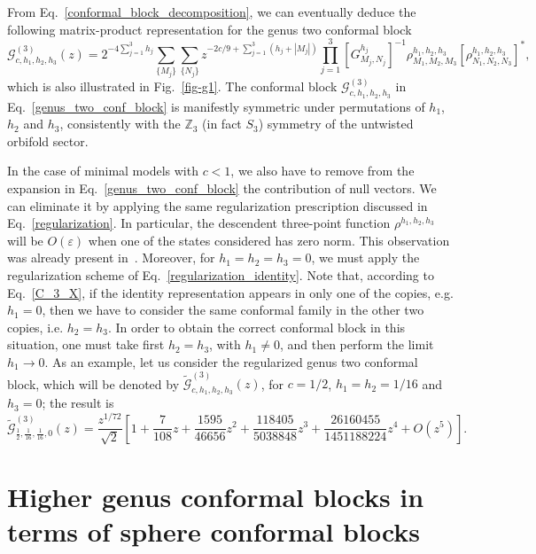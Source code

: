 \documentclass[a4paper,11pt]{article}
\begin{document}
From Eq.~\eqref{conformal_block_decomposition}, we can eventually deduce the following matrix-product representation
for the genus two conformal block \cite{Collier}
\begin{equation}\label{genus_two_conf_block}
 \mathcal{G}_{c, h_1, h_2, h_3}^{(3)}(z)=
 2^{-4\sum\limits_{j=1}^3h_j}
 \sum_{\{M_j\}}\sum_{\{N_j\}}
 z^{-2c/9+\sum\limits_{j=1}^3(h_j+|M_j|)}
 \prod_{j=1}^3 [G_{M_j,N_j}^{h_j}]^{-1}
 \rho^{h_1,h_2,h_3}_{M_1,M_2,M_3}[\rho_{N_1,N_2,N_3}^{h_1,h_2,h_3}]^*,
\end{equation}
which is also illustrated in Fig.~\ref{fig-g1}.
The conformal block $\mathcal{G}_{c, h_1, h_2, h_3}^{(3)}$ in Eq.~\eqref{genus_two_conf_block} is
manifestly symmetric under permutations of $h_1$, $h_2$ and $h_3$, consistently with the $\mathbb Z_3$ (in fact $S_3$) symmetry of the untwisted orbifold sector.

In the case of minimal models with $c<1$, we also have to remove from the expansion in
Eq.~\eqref{genus_two_conf_block} the contribution of null vectors. We can eliminate it by
applying the same regularization prescription discussed in Eq.~\eqref{regularization}. In particular, the descendent three-point function $\rho^{h_1,h_2,h_3}$ will be $O(\varepsilon)$ when one of the states considered  has zero norm. This observation was already present in~\cite{Zamolodchikov2}.
Moreover, for $h_1=h_2=h_3=0$, we must apply the regularization 
scheme of Eq.~\eqref{regularization_identity}. Note that, according to Eq.~\eqref{C_3_X},
if the identity representation appears in only one of the copies, e.g. $h_1=0$, then 
we have to consider the same conformal family in the other two copies, i.e. $h_2=h_3$. In order 
to obtain the correct conformal block in this situation, one must take first $h_2=h_3$, with $h_1\neq0$,
and then perform the limit $h_1\to 0$.  As an example, let us consider the regularized 
genus two conformal block, which will be denoted by $\tilde{\mathcal{G}}_{c, h_1, h_2, h_3}^{(3)}(z)$,
for $c=1/2$, $h_1=h_2=1/16$ and $h_3=0$; the result is
\begin{equation}
 \tilde{\mathcal{G}}_{\frac{1}{2}, \frac{1}{16}, \frac{1}{16}, 0}^{(3)}(z)=
 \frac{z^{1/72}}{\sqrt{2}}\left[1 + \frac{7}{108}z + \frac{1595}{46656}z^2 + \frac{118405}{5038848}z^3 + 
 \frac{26160455}{1451188224}z^4 + O(z^5)\right].
\end{equation}
\section{Higher genus conformal blocks in terms of sphere conformal blocks}\label{app_sphere_conf_blocks}
\end{document}
